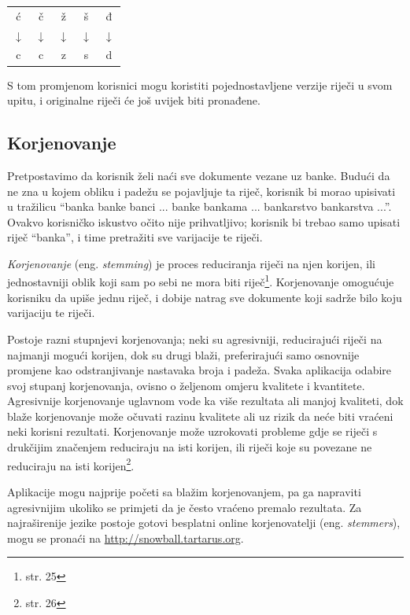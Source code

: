 \documentclass[a4paper,twoside,12pt]{scrreprt}
\newenvironment{nscenter}
 {\par\nopagebreak\centering}
 {\parskip=0pt\par\noindent\ignorespacesafterend}
\begin{document}
\begin{nscenter}
  \begin{tabular}{ccccc}
    ć            & č            & ž            & š            & đ            \\
    $\downarrow$ & $\downarrow$ & $\downarrow$ & $\downarrow$ & $\downarrow$ \\
    c            & c            & z            & s            & d            \\
  \end{tabular}
\end{nscenter}

S tom promjenom korisnici mogu koristiti pojednostavljene verzije riječi u svom upitu, i originalne riječi će još uvijek biti pronađene.

\subsection{Korjenovanje}

Pretpostavimo da korisnik želi naći sve dokumente vezane uz banke. Budući da ne zna u kojem obliku i padežu se pojavljuje ta riječ, korisnik bi morao upisivati u tražilicu ``banka banke banci ... banke bankama ... bankarstvo bankarstva ...''. Ovakvo korisničko iskustvo očito nije prihvatljivo; korisnik bi trebao samo upisati riječ ``banka'', i time pretražiti sve varijacije te riječi.

\textit{Korjenovanje} (eng. \textit{stemming}) je proces reduciranja riječi na njen korijen, ili jednostavniji oblik koji sam po sebi ne mora biti riječ\footnote{\cite{taming} str. 25}. Korjenovanje omogućuje korisniku da upiše jednu riječ, i dobije natrag sve dokumente koji sadrže bilo koju varijaciju te riječi.

Postoje razni stupnjevi korjenovanja; neki su agresivniji, reducirajući riječi na najmanji mogući korijen, dok su drugi blaži, preferirajući samo osnovnije promjene kao odstranjivanje nastavaka broja i padeža. Svaka aplikacija odabire svoj stupanj korjenovanja, ovisno o željenom omjeru kvalitete i kvantitete. Agresivnije korjenovanje uglavnom vode ka više rezultata ali manjoj kvaliteti, dok blaže korjenovanje može očuvati razinu kvalitete ali uz rizik da neće biti vraćeni neki korisni rezultati. Korjenovanje može uzrokovati probleme gdje se riječi s drukčijim značenjem reduciraju na isti korijen, ili riječi koje su povezane ne reduciraju na isti korijen\footnote{\cite{taming} str. 26}.

Aplikacije mogu najprije početi sa blažim korjenovanjem, pa ga napraviti agresivnijim ukoliko se primjeti da je često vraćeno premalo rezultata. Za najraširenije jezike postoje gotovi besplatni online korjenovatelji (eng. \textit{stemmers}), mogu se pronaći na \url{http://snowball.tartarus.org}.
\end{document}
